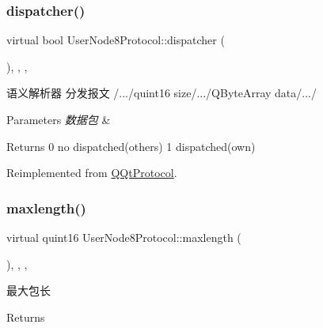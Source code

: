 \subsubsection{\texorpdfstring{dispatcher()}{dispatcher()}}
{\footnotesize\ttfamily virtual bool User\+Node8\+Protocol\+::dispatcher (\begin{DoxyParamCaption}\item[{const Q\+Byte\+Array \&}]{ }\end{DoxyParamCaption})\hspace{0.3cm}{\ttfamily [inline]}, {\ttfamily [override]}, {\ttfamily [protected]}, {\ttfamily [virtual]}}



语义解析器 分发报文 /.../quint16 size/.../\+Q\+Byte\+Array data/.../ 


\begin{DoxyParams}{Parameters}
{\em 数据包} & \\
\hline
\end{DoxyParams}
\begin{DoxyReturn}{Returns}
0 no dispatched(others) 1 dispatched(own) 
\end{DoxyReturn}


Reimplemented from \mbox{\hyperlink{class_q_qt_protocol_a35a69c4b89c8cf7459038f40d75e0dc9}{Q\+Qt\+Protocol}}.

\mbox{\label{class_user_node8_protocol_aa9161b377e99c0548911c0522ab71898}} 
\subsubsection{\texorpdfstring{maxlength()}{maxlength()}}
{\footnotesize\ttfamily virtual quint16 User\+Node8\+Protocol\+::maxlength (\begin{DoxyParamCaption}{ }\end{DoxyParamCaption})\hspace{0.3cm}{\ttfamily [inline]}, {\ttfamily [override]}, {\ttfamily [protected]}, {\ttfamily [virtual]}}



最大包长 

\begin{DoxyReturn}{Returns}

\end{DoxyReturn}



